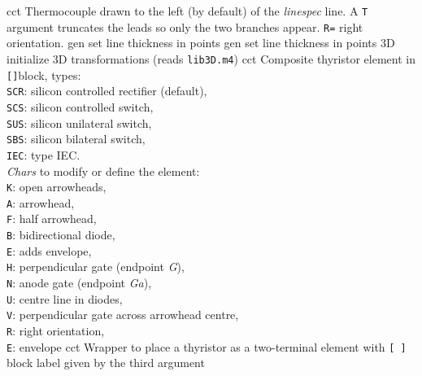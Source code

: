 %
  {cct}%
  { Thermocouple drawn to the left (by default) of the
    {\sl linespec} line.  A {\tt T} argument truncates the leads so
    only the two branches appear.  {\tt R=} right orientation.
    }%
%
  {gen}%
  {set line thickness in points}%
%
  {gen}%
  {set line thickness in points}%
%
  {3D} {initialize 3D transformations (reads {\tt lib3D.m4})}%
%
  {cct}%
  {Composite thyristor element in {\tt []}block, types:\\
                     {\tt SCR}: silicon controlled rectifier (default),\\
                     {\tt SCS}: silicon controlled switch,\\
                     {\tt SUS}: silicon unilateral switch,\\
                     {\tt SBS}: silicon bilateral switch,\\
                     {\tt IEC}: type IEC.\\
   {\sl Chars} to modify or define the element:\\
                     {\tt K}: open arrowheads,\\
                     {\tt A}: arrowhead,\\
                     {\tt F}: half arrowhead,\\
                     {\tt B}: bidirectional diode,\\
                     {\tt E}: adds envelope,\\
                     {\tt H}: perpendicular gate (endpoint {\sl G}),\\
                     {\tt N}: anode gate (endpoint {\sl Ga}),\\
                     {\tt U}: centre line in diodes,\\
                     {\tt V}: perpendicular gate across arrowhead centre,\\
                     {\tt R}: right orientation,\\
                     {\tt E}: envelope
    }%
%
  {cct}%
  {Wrapper to place a thyristor as a two-terminal element with
   {\tt [ ]} block label given by the third argument
    }%
